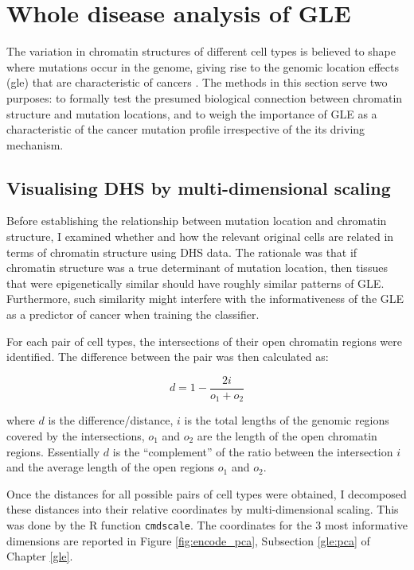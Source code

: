 \section{Whole disease analysis of GLE}\label{methods:gle}

The variation in chromatin structures of different cell types is believed to shape where mutations occur in the genome, giving rise to the genomic location effects (\gls{gle}) that are characteristic of cancers \citep{Polak2015}. The methods in this section serve two purposes: to formally test the presumed biological connection between chromatin structure and mutation locations, and to weigh the importance of GLE as a characteristic of the cancer mutation profile irrespective of the its driving mechanism.  

\subsection{Visualising DHS by multi-dimensional scaling}\label{methods:encode_pca}
Before establishing the relationship between mutation location and chromatin structure, I examined whether and how the relevant original cells are related in terms of chromatin structure using DHS data. The rationale was that if chromatin structure was a true determinant of mutation location, then tissues that were epigenetically similar should have roughly similar patterns of GLE. Furthermore, such similarity might interfere with the informativeness of the GLE as a predictor of cancer when training the classifier.

For each pair of cell types, the intersections of their open chromatin regions were identified. The difference between the pair was then calculated as:

\begin{equation}
    d = 1 - \frac{2i}{o_1 + o_2}
\end{equation}

where $d$ is the difference/distance, $i$ is the total lengths of the genomic regions covered by the intersections, $o_1$ and $o_2$ are the length of the open chromatin regions. Essentially $d$ is the ``complement'' of the ratio between the intersection $i$ and the average length of the open regions $o_1$ and $o_2$. 

Once the distances for all possible pairs of cell types were obtained, I decomposed these distances into their relative coordinates by multi-dimensional scaling. This was done by the R function \texttt{cmdscale}. The coordinates for the 3 most informative dimensions are reported in Figure \ref{fig:encode_pca}, Subsection \ref{gle:pca} of Chapter \ref{gle}.

